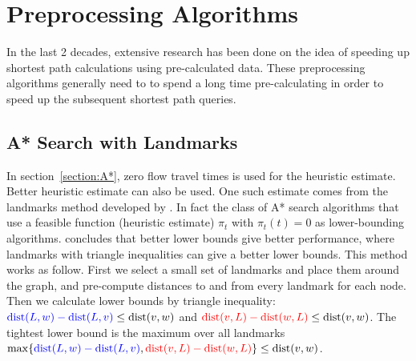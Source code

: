 \section{Preprocessing Algorithms}
In the last 2 decades,
extensive research has been done on the idea of speeding up shortest path calculations using pre-calculated data.
These preprocessing algorithms generally need to to spend a long time pre-calculating in order to speed up the subsequent shortest path queries.
\subsection{A* Search with Landmarks}
In section~\ref{section:A*}, zero flow travel times is used for the heuristic estimate.
Better heuristic estimate can also be used. One such estimate comes from the landmarks method developed by \citet{GoldbergLandmarks}.
In fact the class of A* search algorithms that use a feasible function (heuristic estimate) $\pi_t$ with $\pi_t(t) = 0$ as lower-bounding algorithms.
\citet{GoldbergLandmarks} concludes that better lower bounds give better performance, 
where landmarks with triangle inequalities can give a better lower bounds.
This method works as follow.
First we select a small set of landmarks and place them around the graph,
and pre-compute distances to and from every landmark for each node.
Then we calculate lower bounds by triangle inequality:
$ \textcolor{blue}{\text{dist}(L,w)-\text{dist}(L,v)} \leq \text{dist}(v, w)$ 
and
$ \textcolor{red}{\text{dist}(v,L)-\text{dist}(w,L)} \leq \text{dist}(v, w)$.
The tightest lower bound is the maximum over all landmarks
$ \max\{ \textcolor{blue}{\text{dist}(L,w)-\text{dist}(L,v)}, \textcolor{red}{\text{dist}(v,L)-\text{dist}(w,L)} \} \leq \text{dist}(v,w)$.

